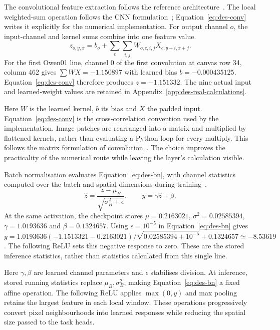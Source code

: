 The convolutional feature extraction follows the reference architecture~\cite[pp.~4--5]{kizilirmak2023}. The local weighted-sum operation follows the CNN formulation~\cite[pp.~6--8]{lecun1998}; Equation~\ref{eq:des-conv} writes it explicitly for the numerical implementation. For output channel $o$, the input-channel and kernel sums combine into one feature value.
\begin{equation}
z_{o,y,x}=b_o+\sum_c\sum_{i,j}W_{o,c,i,j}X_{c,y+i,x+j}.
\label{eq:des-conv}
\end{equation}
For the first Owen01 line, channel 0 of the first convolution at canvas row 34, column 462 gives $\sum WX=-1.150897$ with learned bias $b=-0.000435125$. Equation~\ref{eq:des-conv} therefore produces $z=-1.151332$. The nine actual input and learned-weight values are retained in Appendix~\ref{app:des-real-calculations}.

Here $W$ is the learned kernel, $b$ its bias and $X$ the padded input. Equation~\ref{eq:des-conv} is the cross-correlation convention used by the implementation. Image patches are rearranged into a matrix and multiplied by flattened kernels, rather than evaluating a Python loop for every multiply. This follows the matrix formulation of convolution~\cite{chellapilla2006}. The choice improves the practicality of the numerical route while leaving the layer's calculation visible.

Batch normalisation evaluates Equation~\ref{eq:des-bn}, with channel statistics computed over the batch and spatial dimensions during training~\cite[pp.~4--5]{ioffe2015}.
\begin{equation}
\widehat z=\frac{z-\mu_B}{\sqrt{\sigma_B^2+\epsilon}},\qquad
y=\gamma\widehat z+\beta.
\label{eq:des-bn}
\end{equation}
At the same activation, the checkpoint stores $\mu=0.2163021$, $\sigma^2=0.02585394$, $\gamma=1.0193636$ and $\beta=0.1324657$. Using $\epsilon=10^{-5}$ in Equation~\ref{eq:des-bn} gives $y=1.0193636(-1.1513321-0.2163021)/\sqrt{0.02585394+10^{-5}}+0.1324657\simeq-8.53619$. The following ReLU sets this negative response to zero. These are the stored inference statistics, rather than statistics calculated from this single line.

Here $\gamma,\beta$ are learned channel parameters and $\epsilon$ stabilises division. At inference, stored running statistics replace $\mu_B,\sigma_B^2$, making Equation~\ref{eq:des-bn} a fixed affine operation. The following ReLU applies $\max(0,y)$ and max pooling retains the largest feature in each local window. These operations progressively convert pixel neighbourhoods into learned responses while reducing the spatial size passed to the task heads.

